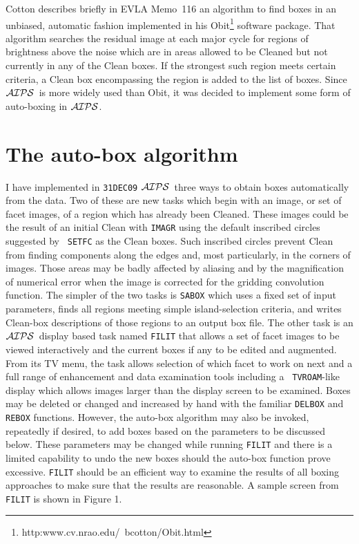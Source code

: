 \documentclass[twoside]{article}
\newcommand{\AIPS}{{$\cal AIPS\/$}}
\begin{document}
Cotton describes briefly in EVLA Memo~116 an algorithm to find boxes
in an unbiased, automatic fashion implemented in his
Obit\footnote{http:www.cv.nrao.edu/~bcotton/Obit.html} software
package.  That algorithm searches the residual image at each major
cycle for regions of brightness above the noise which are in areas
allowed to be Cleaned but not currently in any of the Clean boxes.
If the strongest such region meets certain criteria, a Clean box
encompassing the region is added to the list of boxes.  Since \AIPS\
is more widely used than Obit, it was decided to implement some form
of auto-boxing in \AIPS\@.

\section{The auto-box algorithm}

I have implemented in {\tt 31DEC09} \AIPS\ three ways to obtain boxes
automatically from the data.  Two of these are new tasks which begin
with an image, or set of facet images, of a region which has already
been Cleaned.  These images could be the result of an initial Clean
with {\tt IMAGR} using the default inscribed circles suggested by {\tt
  SETFC} as the Clean boxes.  Such inscribed circles prevent Clean
from finding components along the edges and, most particularly, in the
corners of images.  Those areas may be badly affected by aliasing and
by the magnification of numerical error when the image is corrected
for the gridding convolution function.  The simpler of the two tasks
is {\tt SABOX} which uses a fixed set of input parameters, finds all
regions meeting simple island-selection criteria, and writes
Clean-box descriptions of those regions to an output box file.  The
other task is an \AIPS\ display based task named {\tt FILIT} that
allows a set of facet images to be viewed interactively and the
current boxes if any to be edited and augmented.  From its TV menu,
the task allows selection of which facet to work on next and a full
range of enhancement and data examination tools including a {\tt
  TVROAM}-like display which allows images larger than the display
screen to be examined.  Boxes may be deleted or changed and increased
by hand with the familiar {\tt DELBOX} and {\tt REBOX} functions.
However, the auto-box algorithm may also be invoked, repeatedly if
desired, to add boxes based on the parameters to be discussed below.
These parameters may be changed while running {\tt FILIT} and there is
a limited capability to undo the new boxes should the auto-box
function prove excessive.  {\tt FILIT} should be an efficient way to
examine the results of all boxing approaches to make sure that the
results are reasonable.  A sample screen from {\tt FILIT} is shown in
Figure 1.
\end{document}
